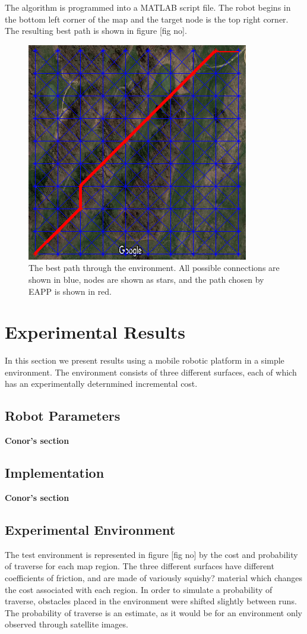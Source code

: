 \documentclass[journal]{IEEEtran}
\begin{document}
The algorithm is programmed into a MATLAB script file. 
The robot begins in the bottom left corner of the map and the target node is the top right corner.
The resulting best path is shown in figure [fig no].

\begin{figure}[h!]
\label{best_path}
\centering
\includegraphics[scale=1]{RCP_soln}
\caption{The best path through the environment. All possible connections are shown in blue, nodes are shown as stars, and the path chosen by EAPP is shown in red.}

\end{figure}

\section{Experimental Results}
In this section we present results using a mobile robotic platform in a simple environment. 
The environment consists of three different surfaces, each of which has an experimentally deternmined incremental cost.

\subsection{Robot Parameters}
\textbf{Conor's section}

\subsection{Implementation}
\textbf{Conor's section}

\subsection{Experimental Environment}
The test environment is represented in figure [fig no] by the cost and probability of traverse for each map region. 
The three different surfaces have different coefficients of friction, and are made of variously squishy? material which changes the cost associated with each region. 
In order to simulate a probability of traverse, obstacles placed in the environment were shifted slightly between runs. 
The probability of traverse is an estimate, as it would be for an environment only observed through satellite images.
\end{document}
